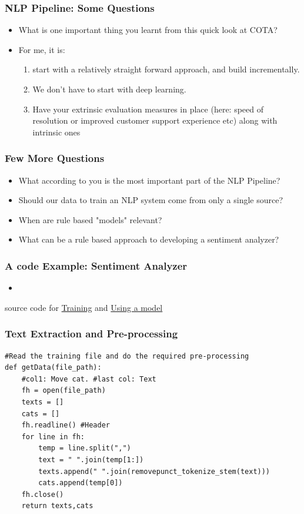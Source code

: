 \documentclass{beamer}
\begin{document}
\begin{frame}
\frametitle{NLP Pipeline: Some Questions}
\begin{itemize}
    \item What is one important thing you learnt from this quick look at COTA?
 \pause \item For me, it is: 
 \begin{enumerate}
     \item start with a relatively straight forward approach, and build incrementally.
     \item We don't have to start with deep learning.  
     \item Have your extrinsic evaluation measures in place (here: speed of resolution or improved customer support experience etc) along with intrinsic ones
 \end{enumerate}
\end{itemize}
\end{frame}

\begin{frame}
\frametitle{Few More Questions}
\begin{itemize}
    \item What according to you is the most important part of the NLP Pipeline? \pause
    \item Should our data to train an NLP system come from only a single source?  \pause
    \item When are rule based "models" relevant? 
    \item What can be a rule based approach to developing a sentiment analyzer?
\end{itemize}
\end{frame}

\begin{frame}
\frametitle{A code Example: Sentiment Analyzer}
\begin{itemize}
    \item 
\end{itemize}
source code for \href{https://github.com/nlpwithoutdataset/MBDS2018-NLPTutorial/blob/master/code/TextClassificationSKLearn.py}{Training} and \href{https://github.com/nlpwithoutdataset/MBDS2018-NLPTutorial/blob/master/code/SentimentClassifier.py}{Using a model}
\end{frame}

\begin{frame}[fragile]
\frametitle{Text Extraction and Pre-processing}
\tiny
\begin{verbatim}
#Read the training file and do the required pre-processing
def getData(file_path):
    #col1: Move cat. #last col: Text
    fh = open(file_path)
    texts = []
    cats = []
    fh.readline() #Header
    for line in fh:
        temp = line.split(",")
        text = " ".join(temp[1:])
        texts.append(" ".join(removepunct_tokenize_stem(text)))
        cats.append(temp[0])
    fh.close()
    return texts,cats
\end{verbatim}
\end{frame}
\end{document}
